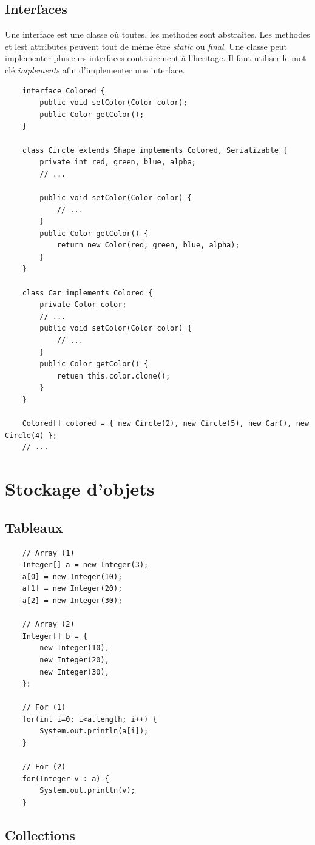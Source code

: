 \documentclass[a4paper, 12pt, french]{article}
\begin{document}
	\subsection{Interfaces}

	Une interface est une classe où toutes, les methodes sont abstraites. Les methodes et lest attributes peuvent tout de même être \emph{static} ou \emph{final}. Une classe peut implementer plusieurs interfaces contrairement à l'heritage. Il faut utiliser le mot clé \emph{implements} afin d'implementer une interface.

	\begin{lstlisting}
	interface Colored {
		public void setColor(Color color);
		public Color getColor();
	}

	class Circle extends Shape implements Colored, Serializable {
		private int red, green, blue, alpha;
		// ...

		public void setColor(Color color) {
			// ...
		}
		public Color getColor() {
			return new Color(red, green, blue, alpha);
		}
	}

	class Car implements Colored {
		private Color color;
		// ...
		public void setColor(Color color) {
			// ...
		}
		public Color getColor() {
			retuen this.color.clone();
		}
	}

	Colored[] colored = { new Circle(2), new Circle(5), new Car(), new Circle(4) };
	// ...
	\end{lstlisting}

	\section{Stockage d'objets}

	\subsection{Tableaux}

	\begin{lstlisting}
	// Array (1)
	Integer[] a = new Integer(3);
	a[0] = new Integer(10);
	a[1] = new Integer(20);
	a[2] = new Integer(30);

	// Array (2)
	Integer[] b = {
		new Integer(10),
		new Integer(20),
		new Integer(30),
	};

	// For (1)
	for(int i=0; i<a.length; i++) {	
		System.out.println(a[i]);
	}

	// For (2)
	for(Integer v : a) {
		System.out.println(v);
	}
	\end{lstlisting}

	\subsection{Collections}
\end{document}
